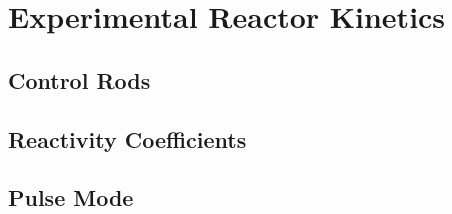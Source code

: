 \documentclass[11pt,a4paper,twoside]{book}
\begin{document}

\pagestyle{fancy} %

\part{Experimental Reactor Kinetics}
\chapter{Control Rods}
\graphicspath{{chapters/experimental_reactor_kinetics/images/}}



\chapter{Reactivity Coefficients}

\chapter{Pulse Mode}


%
\end{document}
